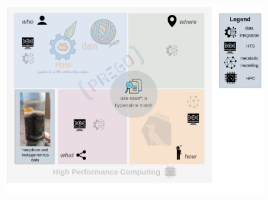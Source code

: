 \documentclass{beamer}
\begin{document}
\begin{darkframes}
\begin{frame}
      \end{frame}   
   \end{darkframes}
   
   \begin{frame}
      \includegraphics[width=115mm]{resources/phd_graphical_abstract-marsh.png}
   \end{frame}
\end{document}
